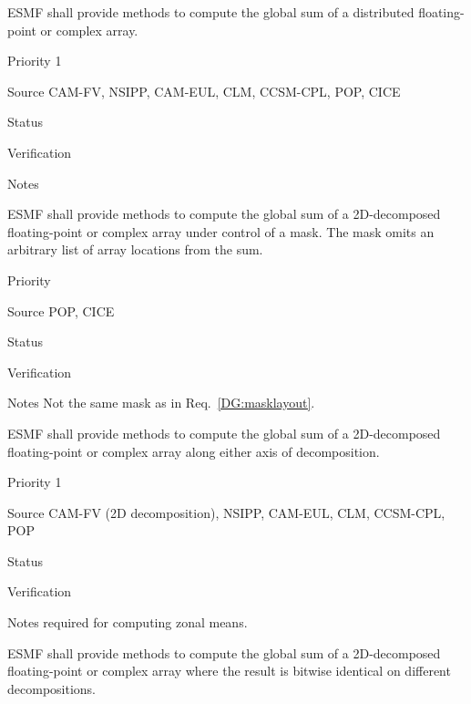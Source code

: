 
ESMF shall provide methods to compute the global sum of a distributed
floating-point or complex array.

\begin{reqlist}
\item[Priority] 1
\item[Source] CAM-FV, NSIPP, CAM-EUL, CLM, CCSM-CPL, POP, CICE
\item[Status]
\item[Verification]
\item[Notes]
\end{reqlist}

 \label{DG:masksum}

ESMF shall provide methods to compute the global sum of a 2D-decomposed
floating-point or complex array under control of a mask. The mask
omits an arbitrary list of array locations from the sum.

\begin{reqlist}
\item[Priority]
\item[Source] POP, CICE
\item[Status]
\item[Verification]
\item[Notes] Not the same mask as in Req.~\ref{DG:masklayout}.
\end{reqlist}


ESMF shall provide methods to compute the global sum of a 2D-decomposed
floating-point or complex array along either axis of decomposition.

\begin{reqlist}
\item[Priority] 1
\item[Source] CAM-FV (2D decomposition), NSIPP, CAM-EUL, CLM, CCSM-CPL, POP
\item[Status]
\item[Verification]
\item[Notes] required for computing zonal means.
\end{reqlist}


ESMF shall provide methods to compute the global sum of a
2D-decomposed floating-point or complex array where the result is
bitwise identical on different decompositions.

